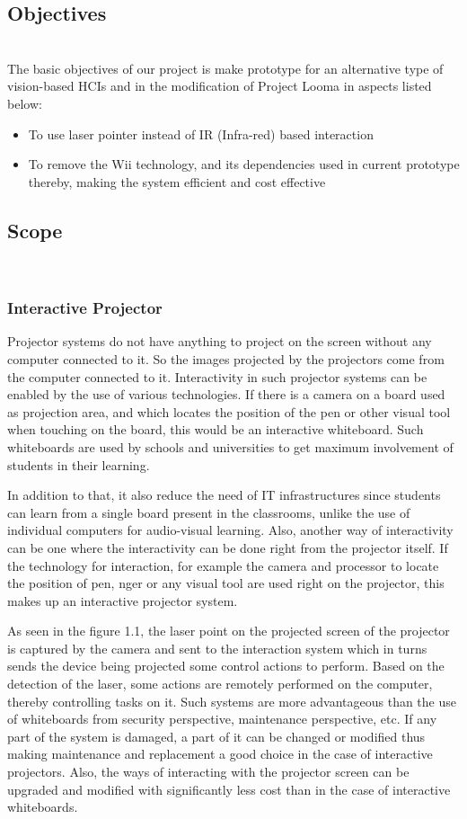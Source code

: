 \documentclass[12pt, a4paper]{article}
\begin{document}
\subsection{Objectives}
~\\
The basic objectives of our project is make prototype for an alternative type of vision-based HCIs and in the modification of Project Looma in aspects listed below:
\begin{itemize}
	\item To use laser pointer instead of IR (Infra-red) based interaction
	\item To remove the Wii technology, and its dependencies used in current prototype thereby, making the system efficient and cost effective
\end{itemize}

\subsection{Scope}
~\\
\subsubsection{Interactive Projector}
Projector systems do not have anything to project on the screen without
any computer connected to it. So the images projected by the projectors
come from the computer connected to it. Interactivity in such projector
systems can be enabled by the use of various technologies. If there is a camera
on a board used as projection area, and which locates the position of the pen
or other visual tool when touching on the board, this would be an interactive
whiteboard. Such whiteboards are used by schools and universities to get
maximum involvement of students in their learning. 

In addition to that, it also reduce the need of IT infrastructures since students can learn from a
single board present in the classrooms, unlike the use of individual computers
for audio-visual learning. Also, another way of interactivity can be one where
the interactivity can be done right from the projector itself. If the technology
for interaction, for example the camera and processor to locate the position
of pen, nger or any visual tool are used right on the projector, this makes up
an interactive projector system. 

As seen in the figure 1.1, the laser point on the projected screen of the projector is captured by the camera and sent to the interaction system which in turns sends the device being projected some control actions to perform. Based on the detection of the laser, some actions are remotely performed on the computer, thereby controlling tasks on it. Such systems are more advantageous than
the use of whiteboards from security perspective, maintenance perspective,
etc. If any part of the system is damaged, a part of it can be changed
or modified thus making maintenance and replacement a good choice in the
case of interactive projectors. Also, the ways of interacting with the projector
screen can be upgraded and modified with significantly less cost than in the
case of interactive whiteboards. 
\end{document}
